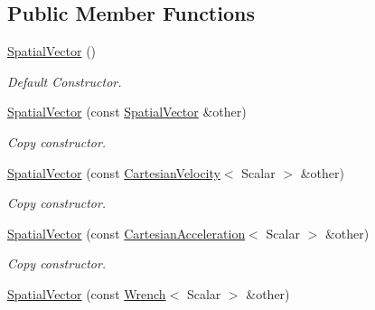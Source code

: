 \subsection*{Public Member Functions}
\begin{DoxyCompactItemize}
\item 
\hyperlink{classow__core_1_1SpatialVector_a00d8e2127333e46b1f60220f2b917b5f}{Spatial\+Vector} ()\hypertarget{classow__core_1_1SpatialVector_a00d8e2127333e46b1f60220f2b917b5f}{}\label{classow__core_1_1SpatialVector_a00d8e2127333e46b1f60220f2b917b5f}

\begin{DoxyCompactList}\small\item\em Default Constructor. \end{DoxyCompactList}\item 
\hyperlink{classow__core_1_1SpatialVector_a9df42d229d009859a206a7bea344cd07}{Spatial\+Vector} (const \hyperlink{classow__core_1_1SpatialVector}{Spatial\+Vector} \&other)\hypertarget{classow__core_1_1SpatialVector_a9df42d229d009859a206a7bea344cd07}{}\label{classow__core_1_1SpatialVector_a9df42d229d009859a206a7bea344cd07}

\begin{DoxyCompactList}\small\item\em Copy constructor. \end{DoxyCompactList}\item 
\hyperlink{classow__core_1_1SpatialVector_a7ac7cb99823a47d4a77a6dc6d426e0aa}{Spatial\+Vector} (const \hyperlink{classow__core_1_1CartesianVelocity}{Cartesian\+Velocity}$<$ Scalar $>$ \&other)\hypertarget{classow__core_1_1SpatialVector_a7ac7cb99823a47d4a77a6dc6d426e0aa}{}\label{classow__core_1_1SpatialVector_a7ac7cb99823a47d4a77a6dc6d426e0aa}

\begin{DoxyCompactList}\small\item\em Copy constructor. \end{DoxyCompactList}\item 
\hyperlink{classow__core_1_1SpatialVector_a9e37dab1ab9f8009bf0cbd4eeee5b9f3}{Spatial\+Vector} (const \hyperlink{classow__core_1_1CartesianAcceleration}{Cartesian\+Acceleration}$<$ Scalar $>$ \&other)\hypertarget{classow__core_1_1SpatialVector_a9e37dab1ab9f8009bf0cbd4eeee5b9f3}{}\label{classow__core_1_1SpatialVector_a9e37dab1ab9f8009bf0cbd4eeee5b9f3}

\begin{DoxyCompactList}\small\item\em Copy constructor. \end{DoxyCompactList}\item 
\hyperlink{classow__core_1_1SpatialVector_a976e5860d9706847961d79265f2ca406}{Spatial\+Vector} (const \hyperlink{classow__core_1_1Wrench}{Wrench}$<$ Scalar $>$ \&other)\hypertarget{classow__core_1_1SpatialVector_a976e5860d9706847961d79265f2ca406}{}\label{classow__core_1_1SpatialVector_a976e5860d9706847961d79265f2ca406}


\end{DoxyCompactItemize}
